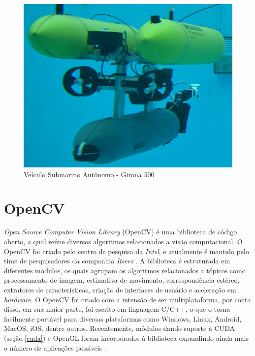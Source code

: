 \begin{figure}[H]
 	\centering
 	\includegraphics[scale=0.1]{./Resources/G500.jpg}
 	\caption{Veículo Submarino Autônomo - Girona 500}
 	\label{G500}
\end{figure}

\section{OpenCV}
\textit{Open Source Computer Vision Library} (OpenCV) é uma biblioteca de código aberto, a qual reúne diversos algoritmos relacionados a visão computacional. O OpenCV foi criado pelo centro de pesquisa da \textit{Intel}, e atualmente é mantido pelo time de pesquisadores da companhia \textit{Itseez} \cite{ItseezOpenCVinfo}. A biblioteca é estruturada em diferentes módulos, os quais agrupam os algoritmos relacionados a tópicos como processamento de imagem, estimativa de movimento, correspondência estéreo, extratores de características, criação de interfaces de usuário e aceleração em \textit{hardware}. O OpenCV foi criado com a intensão de ser multiplataforma, por conta disso, em sua maior parte, foi escrito em linguagem C/C++, o que o torna facilmente portável para diversas plataformas como Windows, Linux, Android, MacOS, iOS, dentre outros. Recentemente, módulos dando suporte à CUDA (seção \ref{cuda}) e OpenGL foram incorporados à biblioteca expandindo ainda mais o número de aplicações possíveis \cite{ItseezOpenCVPlatforms}. 



